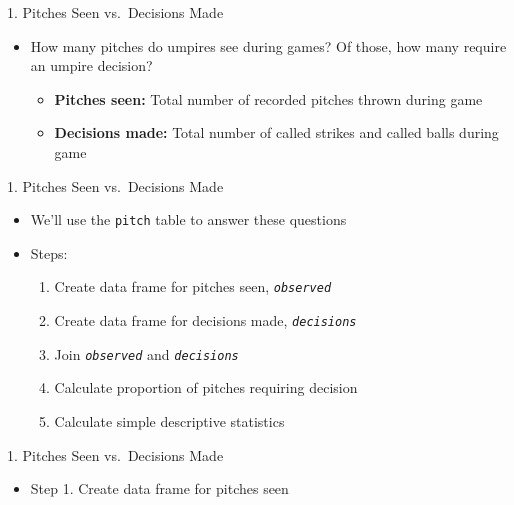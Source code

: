 \documentclass[14pt,ignorenonframetext,aspectratio = 1610]{beamer}
\newenvironment{Shaded}{\begin{snugshade}}{\end{snugshade}}
\newcommand{\KeywordTok}[1]{\textcolor[rgb]{0.13,0.29,0.53}{\textbf{{#1}}}}
\newcommand{\DataTypeTok}[1]{\textcolor[rgb]{0.13,0.29,0.53}{{#1}}}
\newcommand{\StringTok}[1]{\textcolor[rgb]{0.31,0.60,0.02}{{#1}}}
\newcommand{\NormalTok}[1]{{#1}}
\providecommand{\tightlist}{%
\setlength{\itemsep}{0pt}\setlength{\parskip}{0pt}}
\begin{document}
\begin{frame}{1. Pitches Seen vs.~Decisions Made}

\begin{itemize}
\tightlist
\item
  How many pitches do umpires see during games? Of those, how many
  require an umpire decision?

  \begin{itemize}
  \tightlist
  \item
    \textbf{Pitches seen:} Total number of recorded pitches thrown
    during game
  \item
    \textbf{Decisions made:} Total number of called strikes and called
    balls during game
  \end{itemize}
\end{itemize}

\end{frame}

\begin{frame}[fragile]{1. Pitches Seen vs.~Decisions Made}

\begin{itemize}
\tightlist
\item
  We'll use the \texttt{pitch} table to answer these questions
\item
  Steps:

  \begin{enumerate}
  \def\labelenumi{\arabic{enumi}.}
  \tightlist
  \item
    Create data frame for pitches seen, \emph{\texttt{observed}}
  \item
    Create data frame for decisions made, \emph{\texttt{decisions}}
  \item
    Join \emph{\texttt{observed}} and \emph{\texttt{decisions}}
  \item
    Calculate proportion of pitches requiring decision
  \item
    Calculate simple descriptive statistics
  \end{enumerate}
\end{itemize}

\end{frame}

\begin{frame}[fragile]{1. Pitches Seen vs.~Decisions Made}

\begin{itemize}
\tightlist
\item
  Step 1. Create data frame for pitches seen
\end{itemize}

\footnotesize

\begin{Shaded}
\end{Shaded}

\end{frame}
\end{document}
